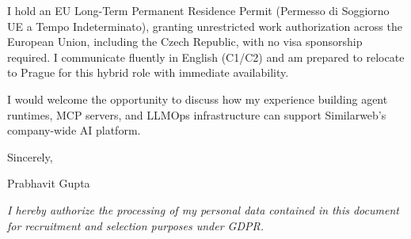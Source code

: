 \documentclass[10.5pt,a4paper]{article}
\begin{document}
I hold an EU Long-Term Permanent Residence Permit (Permesso di Soggiorno UE a Tempo Indeterminato), granting unrestricted work authorization across the European Union, including the Czech Republic, with no visa sponsorship required. I communicate fluently in English (C1/C2) and am prepared to relocate to Prague for this hybrid role with immediate availability.

I would welcome the opportunity to discuss how my experience building agent runtimes, MCP servers, and LLMOps infrastructure can support Similarweb's company-wide AI platform.

Sincerely,

Prabhavit Gupta

\vspace{0.6em}
{\footnotesize \textit{I hereby authorize the processing of my personal data contained in this document for recruitment and selection purposes under GDPR.}\par}
\end{document}
